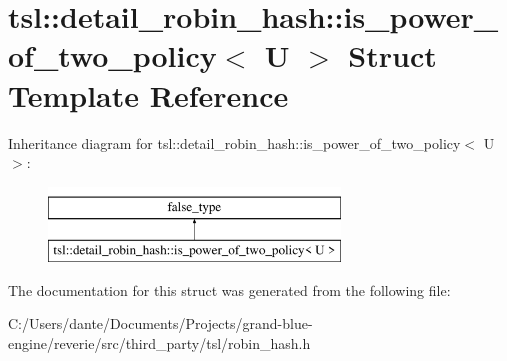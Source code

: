 \hypertarget{structtsl_1_1detail__robin__hash_1_1is__power__of__two__policy}{}\section{tsl\+::detail\+\_\+robin\+\_\+hash\+::is\+\_\+power\+\_\+of\+\_\+two\+\_\+policy$<$ U $>$ Struct Template Reference}
\label{structtsl_1_1detail__robin__hash_1_1is__power__of__two__policy}
Inheritance diagram for tsl\+::detail\+\_\+robin\+\_\+hash\+::is\+\_\+power\+\_\+of\+\_\+two\+\_\+policy$<$ U $>$\+:\begin{figure}[H]
\begin{center}
\leavevmode
\includegraphics[height=2.000000cm]{structtsl_1_1detail__robin__hash_1_1is__power__of__two__policy}
\end{center}
\end{figure}


The documentation for this struct was generated from the following file\+:\begin{DoxyCompactItemize}
\item 
C\+:/\+Users/dante/\+Documents/\+Projects/grand-\/blue-\/engine/reverie/src/third\+\_\+party/tsl/robin\+\_\+hash.\+h\end{DoxyCompactItemize}
